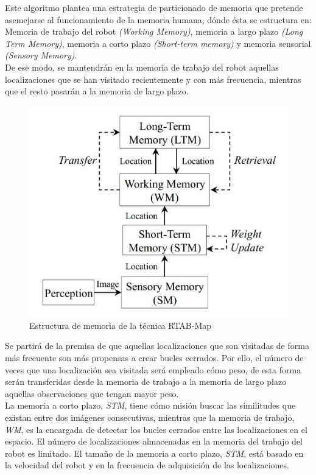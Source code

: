 Este algoritmo plantea una estrategia de particionado de memoria que pretende asemejarse al funcionamiento de la memoria humana, 
dónde ésta se estructura en: \\
Memoria de trabajo del robot \textit{(Working Memory)}, memoria a largo plazo \textit{(Long Term Memory)}, 
memoria a corto plazo \textit{(Short-term memory)} y memoria sensorial \textit{(Sensory Memory)}. \\
De ese modo, se mantendrán en la memoria de trabajo del robot aquellas localizaciones que se han visitado recientemente 
y con más frecuencia, mientras que el resto pasarán a la memoria de largo plazo. \\

\begin{figure}[h!]
    \centering
    \includegraphics[width=.4\textwidth]{images/rtabmap_memory}
    \caption{Estructura de memoria de la técnica RTAB-Map}
\end{figure}


Se partirá de la premisa de que aquellas localizaciones que son visitadas de forma más frecuente son más propensas a 
crear bucles cerrados. Por ello, el número de veces que una localización sea visitada será empleado cómo peso, de 
esta forma serán transferidas desde la memoria de trabajo a la memoria de largo plazo aquellas observaciones que 
tengan mayor peso.\\
La memoria a corto plazo, \textit{STM}, tiene cómo misión buscar las similitudes que existan entre dos imágenes
consecutivas, mientras que la memoria de trabajo, \textit{WM}, es la encargada de detectar los bucles cerrados entre las
localizaciones en el espacio. El número de localizaciones almacenadas en la memoria del trabajo del robot es
limitado. El tamaño de la memoria a corto plazo, \textit{STM}, está basado en la velocidad del robot y en la frecuencia de
adquisición de las localizaciones. \\

